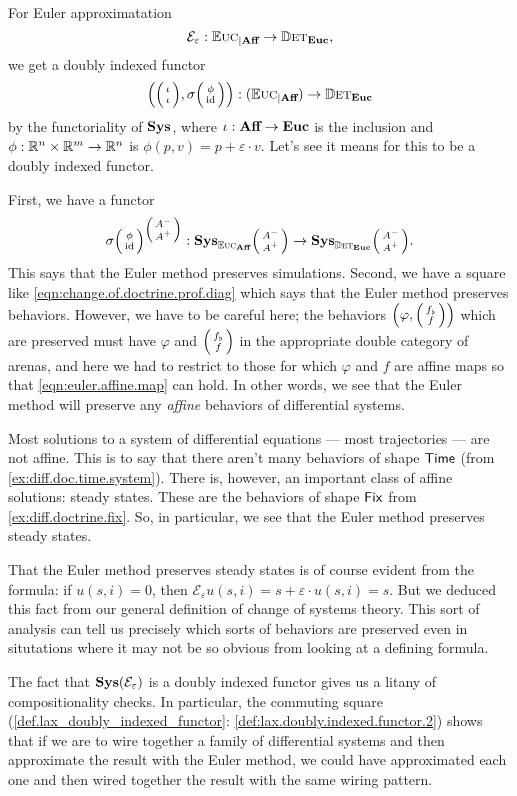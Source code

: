 \documentclass[DynamicalBook]{subfiles}
\begin{document}
\begin{example}
For Euler approximatation 
  \[
\mathcal{E}_{\varepsilon} : \mathbb{E}\textsc{uc}_{|\textbf{Aff}} \to \mathbb{D}\textsc{et}_{\textbf{Euc}},
  \]
  we get a doubly indexed functor
  $$\left(\littlelens{\iota}{\iota}, \sigma\littlelens{\phi}{\id}\right) : \Sys(\eucdiff_{|\textbf{Aff}}) \to \determ_{\Cat{Euc}}$$
  by the functoriality of $\textbf{Sys}$, where $\iota : \textbf{Aff}\to \textbf{Euc}$ is the inclusion and $\phi : \mathbb{R}^n \times \mathbb{R}^m \to
  \mathbb{R}^n$ is $\phi(p, v) = p + \varepsilon \cdot v$. Let's see it means for this
  to be a doubly indexed functor.

  First, we have a functor
  \[
    \sigma\littlelens{\phi}{\id}^{\littlelens{A^-}{A^+}} :
    \Cat{Sys}_{\eucdiff_{\textbf{Aff}}}\littlelens{A^-}{A^+} \to \Cat{Sys}_{\determ_{\Cat{Euc}}}\littlelens{A^-}{A^+}.
  \]
  This says that the Euler method preserves simulations. Second, we have a
  square like \cref{eqn:change.of.doctrine.prof.diag} which says that the Euler
  method preserves behaviors. However, we have to be careful here; the behaviors
  $\left( \varphi, \lens{f_{\flat}}{f} \right)$ which are preserved must have
$\varphi$ and $\lens{f_{\flat}}{f}$ in the appropriate double category of arenas, and here
  we had to restrict to those for which $\varphi$ and $f$ are affine maps so
  that \cref{eqn:euler.affine.map} can hold. In other words, we see that the
  Euler method will preserve any \emph{affine} behaviors of differential systems.

  Most solutions to a system of differential equations --- most trajectories ---
  are not affine. This is to say that
  there aren't many behaviors of shape $\mathsf{Time}$ (from
  \cref{ex:diff.doc.time.system}). There is, however, an important class of
  affine solutions: steady states. These are the behaviors of shape $\mathsf{Fix}$
  from \cref{ex:diff.doctrine.fix}. So, in particular, we see that the Euler
  method preserves steady states.

  That the Euler method preserves steady states is of course evident from the
  formula: if $u(s, i) = 0$, then $\mathcal{E}_{\varepsilon}u(s, i) = s +
  \varepsilon \cdot u(s, i) = s$. But we deduced this fact from our general
  definition of change of systems theory. This sort of analysis can tell us precisely
  which sorts of behaviors are preserved even in situtations where it may not be
  so obvious from looking at a defining formula.

  The fact that $\textbf{Sys}(\mathcal{E}_{\varepsilon})$ is a doubly indexed
  functor gives us a litany of compositionality checks. In particular, the
  commuting square (\cref{def.lax_doubly_indexed_functor}:
  \cref{def:lax.doubly.indexed.functor.2}) shows
  that if we are to wire together a family of differential systems and then
  approximate the result with the Euler method, we could have approximated each
  one and then wired together the result with the same wiring pattern.


  
\end{example}
\end{document}
